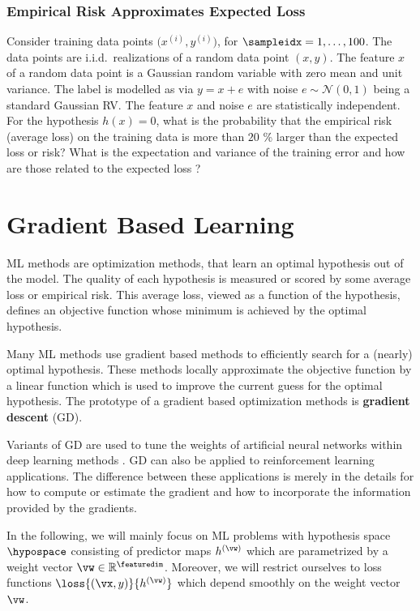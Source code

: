 \documentclass[12pt]{report}
\begin{document}
\subsection{Empirical Risk Approximates Expected Loss} 
\label{ex_chap_5_empriskapp} 
Consider training data points $\big(x^{(i)},y^{(i)} \big)$, for $\sampleidx = 1,\ldots,100$. 
The data points are i.i.d.\ realizations of a random data point $(x,y)$. 
The feature $x$ of a random data point is a Gaussian random variable 
with zero mean and unit variance. The label is modelled as 
via $y = x + e$ with noise $e \sim \mathcal{N}(0,1)$ being 
a standard Gaussian RV. The feature $x$ and noise $e$ 
are statistically independent. For the hypothesis $h(x)=0$, 
what is the probability that the empirical risk (average loss) on 
the training data is more than $20$ \% larger than the 
expected loss or risk? What is the expectation and variance 
of the training error and how are those related to the 
expected loss ? 





\newpage
\chapter{Gradient Based Learning}
\label{ch_GD}

ML methods are optimization methods, that learn an optimal 
hypothesis out of the model. The quality of each hypothesis is 
measured or scored by some average loss or empirical risk. This
average loss, viewed as a function of the hypothesis, defines 
an objective function whose minimum is achieved by the 
optimal hypothesis. 

Many ML methods use gradient based methods to efficiently search 
for a (nearly) optimal hypothesis. These methods locally 
approximate the objective function by a linear function which 
is used to improve the current guess for the optimal hypothesis. 
The prototype of a gradient based optimization methods is 
{\bf gradient descent} (GD). 

Variants of GD are used to tune the weights of artificial neural 
networks within deep learning methods \cite{Goodfellow-et-al-2016}. 
GD can also be applied to reinforcement learning applications. The 
difference between these applications is merely in the details for 
how to compute or estimate the gradient and how to incorporate 
the information provided by the gradients. 

In the following, we will mainly focus on ML problems with hypothesis 
space $\hypospace$ consisting of predictor maps $h^{(\vw)}$ 
which are parametrized by a weight vector $\vw \in \mathbb{R}^{\featuredim}$. 
Moreover, we will restrict ourselves to loss functions $\loss{(\vx,y)}{h^{(\vw)}}$ 
which depend smoothly on the weight vector $\vw$. 
\end{document}
